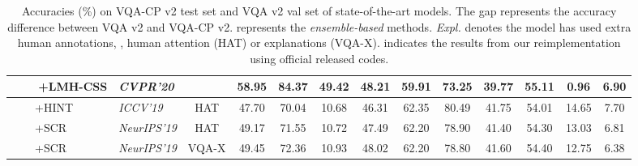 \documentclass[10pt,twocolumn,letterpaper]{article}
\begin{document}
\begin{table*}
\begin{center}
{\begin{tabular}{| l | l | c | c c c c | c c c c| c c|}
				~~~~+\textbf{LMH-CSS} & \textit{CVPR'20} &  & \textbf{58.95} & \textbf{84.37} & \textbf{49.42} & \textbf{48.21} & 59.91 & 73.25 & 39.77 & 55.11 & \textbf{0.96} & \textbf{6.90} \\
				\hline\hline
				~~~~+HINT~\cite{selvaraju2019taking} & \textit{ICCV'19} & HAT & 47.70 & 70.04 & 10.68 & 46.31 & 62.35 & 80.49 & 41.75 & 54.01 & 14.65 & 7.70 \\
				~~~~+SCR~\cite{wu2019self} & \textit{NeurIPS'19} & HAT & 49.17 & 71.55 & 10.72 & 47.49 & 62.20 & 78.90 & 41.40 & 54.30 & 13.03  &  6.81 \\
				~~~~+SCR~\cite{wu2019self} & \textit{NeurIPS'19} & VQA-X & 49.45 & 72.36 & 10.93 & 48.02 & 62.20 & 78.80 & 41.60 & 54.40 & 12.75 & 6.38 \\
				\hline
			\end{tabular}
		} \end{center}
	\vspace{-1.5em}
	\caption[]{Accuracies (\%) on VQA-CP v2 test set and VQA v2 val set of state-of-the-art models. The gap represents the accuracy difference between VQA v2 and VQA-CP v2.  represents the \emph{ensemble-based} methods. \emph{Expl.} denotes the model has used extra human annotations, \eg, human attention (HAT) or explanations (VQA-X).  indicates the results from our reimplementation using official released codes.} \label{tab:SOTA_v2}
	\vspace{-1.5em}
\end{table*}
\end{document}
